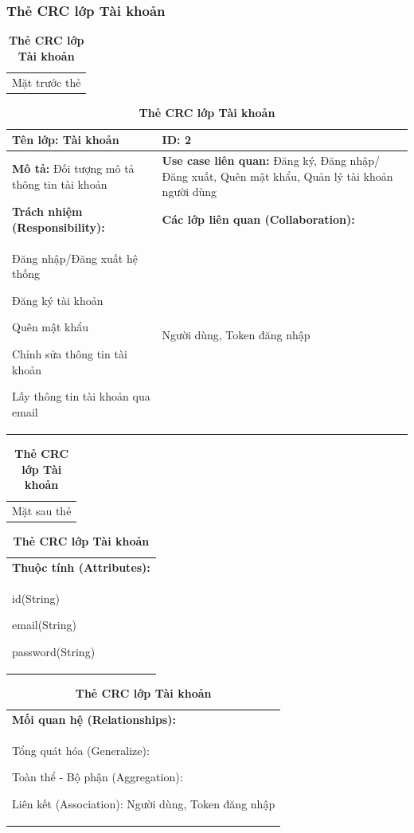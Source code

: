   \subsubsection{Thẻ CRC lớp Tài khoản}
  \begin{table}[H]
    \caption{\bfseries \fontsize{12pt}{0pt}\selectfont Thẻ CRC lớp Tài khoản}
    \centering
    \begin{tabularx}{0.9\textwidth}{X}
      Mặt trước thẻ
    \end{tabularx}
    \begin{tabularx}{0.9\textwidth}{|X|X|}
      \hline
      \textbf{Tên lớp:} Tài khoản & \textbf{ID:} 2 \\
      \hline
      \textbf{Mô tả:} Đối tượng mô tả thông tin tài khoản & \textbf{Use case liên quan:} Đăng ký, Đăng nhập/Đăng xuất, Quên mật khẩu, Quản lý tài khoản người dùng \\
      \hline
      \textbf{Trách nhiệm (Responsibility):} & \textbf{Các lớp liên quan (Collaboration):} \\
      Đăng nhập/Đăng xuất hệ thống

      Đăng ký tài khoản

      Quên mật khẩu

      Chỉnh sửa thông tin tài khoản

      Lấy thông tin tài khoản qua email
      & 
      Người dùng, Token đăng nhập
      \\
      \hline
    \end{tabularx}
    \begin{tabularx}{0.9\textwidth}{X}
      Mặt sau thẻ
    \end{tabularx}
    \begin{tabularx}{0.9\textwidth}{|X|}
      \hline
      \textbf{Thuộc tính (Attributes):} \\
      id(String) 
      
      email(String)

      password(String)
      \\
      \hline
    \end{tabularx}
    \begin{tabularx}{0.9\textwidth}{|X|}
      \textbf{Mối quan hệ (Relationships):} \\
      Tổng quát hóa (Generalize):  

      Toàn thể - Bộ phận (Aggregation):   
      
      Liên kết (Association): Người dùng, Token đăng nhập 
      \\
      \hline
    \end{tabularx}
  \end{table}

